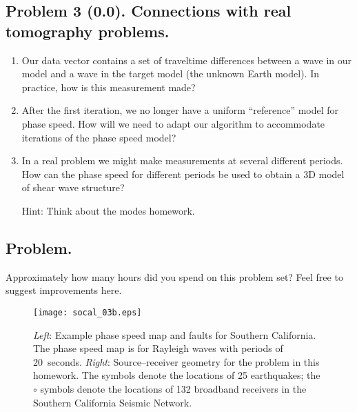 \documentclass[11pt,titlepage,fleqn]{article}
\begin{document}

\pagebreak
\subsection*{Problem 3 (0.0). Connections with real tomography problems.}

\begin{enumerate}
\item Our data vector contains a set of traveltime differences between a wave in our model and a wave in the target model (\ie the unknown Earth model). In practice, how is this measurement made?

\item After the first iteration, we no longer have a uniform ``reference'' model for phase speed. How will we need to adapt our algorithm to accommodate iterations of the phase speed model?


\item In a real problem we might make measurements at several different periods. How can the phase speed for different periods be used to obtain a 3D model of shear wave structure?

Hint: Think about the modes homework.

\end{enumerate}


\subsection*{Problem.}

Approximately how many hours did you spend on this problem set? Feel free to suggest improvements here.




\clearpage\pagebreak

\begin{figure}
\hspace{-0.5cm}
\texttt{[image: socal\_03b.eps]}
\caption[Source--receiver geometry for southern California]
{{
{\em Left}: Example phase speed map and faults for Southern California. The phase speed map is for Rayleigh waves with periods of 20~seconds.
{\em Right}: Source--receiver geometry for the problem in this homework. The  symbols denote the locations of 25 earthquakes; the $\circ$ symbols denote the locations of 132 broadband receivers in the Southern California Seismic Network.
\label{fig:geometry}
}}
\end{figure}
\end{document}
